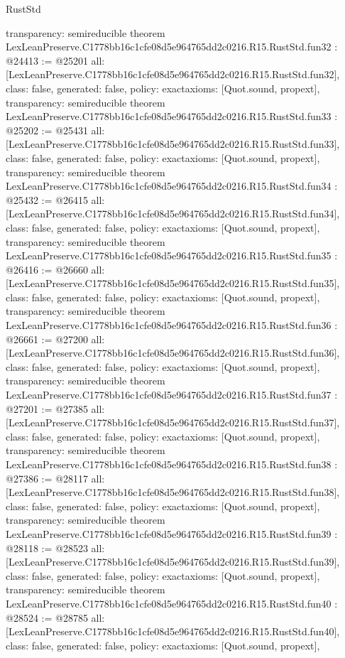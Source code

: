 \begin{lexlean}{RustStd}
\begin{coremodule}
{  transparency: semireducible
}
theorem LexLeanPreserve.C1778bb16c1cfe08d5e964765dd2c0216.R15.RustStd.fun32 : @24413 := @25201 {
  all: [LexLeanPreserve.C1778bb16c1cfe08d5e964765dd2c0216.R15.RustStd.fun32],
  class: false,
  generated: false,
  policy: exact{axioms: [Quot.sound, propext]},
  transparency: semireducible
}
theorem LexLeanPreserve.C1778bb16c1cfe08d5e964765dd2c0216.R15.RustStd.fun33 : @25202 := @25431 {
  all: [LexLeanPreserve.C1778bb16c1cfe08d5e964765dd2c0216.R15.RustStd.fun33],
  class: false,
  generated: false,
  policy: exact{axioms: [Quot.sound, propext]},
  transparency: semireducible
}
theorem LexLeanPreserve.C1778bb16c1cfe08d5e964765dd2c0216.R15.RustStd.fun34 : @25432 := @26415 {
  all: [LexLeanPreserve.C1778bb16c1cfe08d5e964765dd2c0216.R15.RustStd.fun34],
  class: false,
  generated: false,
  policy: exact{axioms: [Quot.sound, propext]},
  transparency: semireducible
}
theorem LexLeanPreserve.C1778bb16c1cfe08d5e964765dd2c0216.R15.RustStd.fun35 : @26416 := @26660 {
  all: [LexLeanPreserve.C1778bb16c1cfe08d5e964765dd2c0216.R15.RustStd.fun35],
  class: false,
  generated: false,
  policy: exact{axioms: [Quot.sound, propext]},
  transparency: semireducible
}
theorem LexLeanPreserve.C1778bb16c1cfe08d5e964765dd2c0216.R15.RustStd.fun36 : @26661 := @27200 {
  all: [LexLeanPreserve.C1778bb16c1cfe08d5e964765dd2c0216.R15.RustStd.fun36],
  class: false,
  generated: false,
  policy: exact{axioms: [Quot.sound, propext]},
  transparency: semireducible
}
theorem LexLeanPreserve.C1778bb16c1cfe08d5e964765dd2c0216.R15.RustStd.fun37 : @27201 := @27385 {
  all: [LexLeanPreserve.C1778bb16c1cfe08d5e964765dd2c0216.R15.RustStd.fun37],
  class: false,
  generated: false,
  policy: exact{axioms: [Quot.sound, propext]},
  transparency: semireducible
}
theorem LexLeanPreserve.C1778bb16c1cfe08d5e964765dd2c0216.R15.RustStd.fun38 : @27386 := @28117 {
  all: [LexLeanPreserve.C1778bb16c1cfe08d5e964765dd2c0216.R15.RustStd.fun38],
  class: false,
  generated: false,
  policy: exact{axioms: [Quot.sound, propext]},
  transparency: semireducible
}
theorem LexLeanPreserve.C1778bb16c1cfe08d5e964765dd2c0216.R15.RustStd.fun39 : @28118 := @28523 {
  all: [LexLeanPreserve.C1778bb16c1cfe08d5e964765dd2c0216.R15.RustStd.fun39],
  class: false,
  generated: false,
  policy: exact{axioms: [Quot.sound, propext]},
  transparency: semireducible
}
theorem LexLeanPreserve.C1778bb16c1cfe08d5e964765dd2c0216.R15.RustStd.fun40 : @28524 := @28785 {
  all: [LexLeanPreserve.C1778bb16c1cfe08d5e964765dd2c0216.R15.RustStd.fun40],
  class: false,
  generated: false,
  policy: exact{axioms: [Quot.sound, propext]},
}
\end{coremodule}
\end{lexlean}
